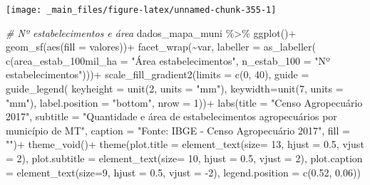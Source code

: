\documentclass[
  brazilian,
]{book}
\newenvironment{Shaded}{\begin{snugshade}}{\end{snugshade}}
\newcommand{\AttributeTok}[1]{\textcolor[rgb]{0.77,0.63,0.00}{#1}}
\newcommand{\CommentTok}[1]{\textcolor[rgb]{0.56,0.35,0.01}{\textit{#1}}}
\newcommand{\DecValTok}[1]{\textcolor[rgb]{0.00,0.00,0.81}{#1}}
\newcommand{\FloatTok}[1]{\textcolor[rgb]{0.00,0.00,0.81}{#1}}
\newcommand{\FunctionTok}[1]{\textcolor[rgb]{0.00,0.00,0.00}{#1}}
\newcommand{\NormalTok}[1]{#1}
\newcommand{\SpecialCharTok}[1]{\textcolor[rgb]{0.00,0.00,0.00}{#1}}
\newcommand{\StringTok}[1]{\textcolor[rgb]{0.31,0.60,0.02}{#1}}
\begin{document}
\begin{center}\texttt{[image: \_main\_files/figure-latex/unnamed-chunk-355-1]} \end{center}

\begin{Shaded}
\begin{Highlighting}[]
\CommentTok{\# Nº estabelecimentos e área}
\NormalTok{dados\_mapa\_muni }\SpecialCharTok{\%\textgreater{}\%} 
  \FunctionTok{ggplot}\NormalTok{()}\SpecialCharTok{+}
  \FunctionTok{geom\_sf}\NormalTok{(}\FunctionTok{aes}\NormalTok{(}\AttributeTok{fill =}\NormalTok{ valores))}\SpecialCharTok{+}
  \FunctionTok{facet\_wrap}\NormalTok{(}\SpecialCharTok{\textasciitilde{}}\NormalTok{var,}
             \AttributeTok{labeller =} \FunctionTok{as\_labeller}\NormalTok{(}
               \FunctionTok{c}\NormalTok{(}\AttributeTok{area\_estab\_100mil\_ha =} \StringTok{"Área estabelecimentos"}\NormalTok{,}
                 \AttributeTok{n\_estab\_100 =} \StringTok{"Nº estabelecimentos"}\NormalTok{)))}\SpecialCharTok{+}
  \FunctionTok{scale\_fill\_gradient2}\NormalTok{(}\AttributeTok{limits =} \FunctionTok{c}\NormalTok{(}\DecValTok{0}\NormalTok{, }\DecValTok{40}\NormalTok{),}
                       \AttributeTok{guide =} \FunctionTok{guide\_legend}\NormalTok{(}
                         \AttributeTok{keyheight =} \FunctionTok{unit}\NormalTok{(}\DecValTok{2}\NormalTok{, }\AttributeTok{units =} \StringTok{"mm"}\NormalTok{),}
                         \AttributeTok{keywidth=}\FunctionTok{unit}\NormalTok{(}\DecValTok{7}\NormalTok{, }\AttributeTok{units =} \StringTok{"mm"}\NormalTok{),}
                         \AttributeTok{label.position =} \StringTok{"bottom"}\NormalTok{, }\AttributeTok{nrow =} \DecValTok{1}\NormalTok{))}\SpecialCharTok{+}
  \FunctionTok{labs}\NormalTok{(}\AttributeTok{title =} \StringTok{"Censo Agropecuário 2017"}\NormalTok{,}
       \AttributeTok{subtitle =} \StringTok{"Quantidade e área de estabelecimentos agropecuários por município de MT"}\NormalTok{,}
       \AttributeTok{caption =} \StringTok{"Fonte: IBGE {-} Censo Agropecuário 2017"}\NormalTok{,}
       \AttributeTok{fill =} \StringTok{""}\NormalTok{)}\SpecialCharTok{+}
  \FunctionTok{theme\_void}\NormalTok{()}\SpecialCharTok{+}
  \FunctionTok{theme}\NormalTok{(}\AttributeTok{plot.title =} \FunctionTok{element\_text}\NormalTok{(}\AttributeTok{size=} \DecValTok{13}\NormalTok{, }\AttributeTok{hjust =} \FloatTok{0.5}\NormalTok{, }\AttributeTok{vjust =} \DecValTok{2}\NormalTok{),}
        \AttributeTok{plot.subtitle =} \FunctionTok{element\_text}\NormalTok{(}\AttributeTok{size=} \DecValTok{10}\NormalTok{, }\AttributeTok{hjust =} \FloatTok{0.5}\NormalTok{, }\AttributeTok{vjust =} \DecValTok{2}\NormalTok{),}
        \AttributeTok{plot.caption =} \FunctionTok{element\_text}\NormalTok{(}\AttributeTok{size=}\DecValTok{9}\NormalTok{, }\AttributeTok{hjust =} \FloatTok{0.5}\NormalTok{, }\AttributeTok{vjust =} \SpecialCharTok{{-}}\DecValTok{2}\NormalTok{),}
        \AttributeTok{legend.position =} \FunctionTok{c}\NormalTok{(}\FloatTok{0.52}\NormalTok{, }\FloatTok{0.06}\NormalTok{))}
\end{Highlighting}
\end{Shaded}
\end{document}
